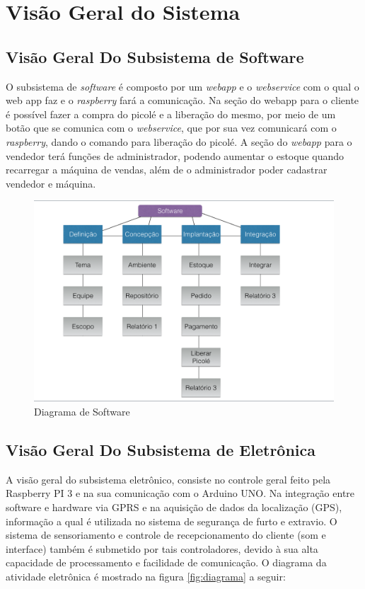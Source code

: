\chapter{Visão Geral do Sistema}

\section{Visão Geral Do Subsistema de Software}

O subsistema de \textit{software} é composto por um \textit{webapp} e o \textit{webservice} com o qual o web app faz e o \textit{raspberry} fará a comunicação. Na seção do webapp para o cliente é possível fazer a compra do picolé e a liberação do mesmo, por meio de um botão que se comunica com o \textit{webservice}, que por sua vez comunicará com o \textit{raspberry}, dando o comando para liberação do picolé. A seção do \textit{webapp} para o vendedor terá funções de administrador, podendo aumentar o estoque quando recarregar a máquina de vendas, além de o administrador poder cadastrar vendedor e máquina.

\begin{figure}[H]
	\centering
    \includegraphics[width=\textwidth]{figuras/vg_software}
    \caption{Diagrama de Software}
    \label{fig:vg_software}
\end{figure}

\newpage

\section{Visão Geral Do Subsistema de Eletrônica}

A visão geral do subsistema eletrônico, consiste no controle geral feito pela Raspberry PI 3 e na sua comunicação com o Arduino UNO. Na integração entre software e hardware via GPRS e na aquisição de dados da localização (GPS), informação a qual é utilizada no sistema de segurança de furto e extravio. O sistema de sensoriamento e controle de recepcionamento do cliente (som e interface) também é submetido por tais controladores, devido à sua alta capacidade de processamento e facilidade de comunicação. O diagrama da atividade eletrônica é mostrado na figura \ref{fig:diagrama} a seguir:

